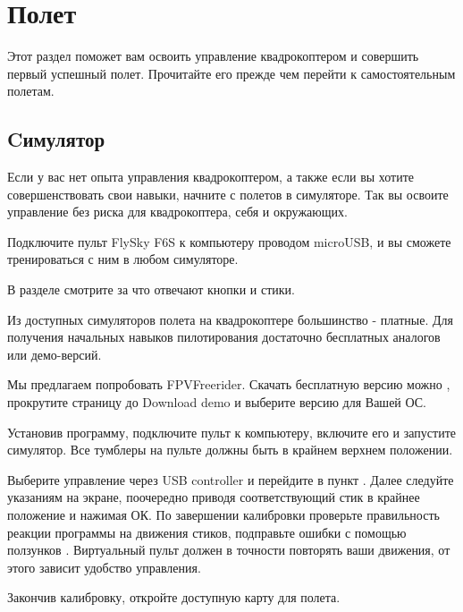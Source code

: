 \documentclass[a4paper,10pt,russian]{sphinxmanual}
\begin{document}
\chapter{Полет}
\label{\detokenize{flight/flight:id1}}\label{\detokenize{flight/flight::doc}}
Этот раздел поможет вам освоить управление квадрокоптером и совершить первый успешный полет. Прочитайте его прежде чем перейти к самостоятельным полетам.


\section{Cимулятор}
\label{\detokenize{flight/simulator:c}}\label{\detokenize{flight/simulator::doc}}
Если у вас нет опыта управления квадрокоптером, а также если вы хотите совершенствовать свои навыки, начните с полетов в симуляторе. Так вы освоите управление без риска для квадрокоптера, себя и окружающих.

Подключите пульт FlySky F6S к компьютеру проводом microUSB, и вы сможете тренироваться с ним в любом симуляторе.

В разделе {\hyperref[\detokenize{flight/rc_unit::doc}]{}} смотрите за что отвечают кнопки и стики.

Из доступных симуляторов полета на квадрокоптере большинство - платные. Для получения начальных навыков пилотирования достаточно бесплатных аналогов или демо-версий.

Мы предлагаем попробовать FPVFreerider. Скачать бесплатную версию можно  , прокрутите страницу до Download demo и выберите версию для Вашей ОС.

Установив программу, подключите пульт к компьютеру, включите его и запустите симулятор. Все тумблеры на пульте должны быть в крайнем верхнем положении.

\noindent{}

Выберите управление через USB controller и перейдите в пункт . Далее следуйте указаниям на экране, поочередно приводя соответствующий стик в крайнее положение и нажимая ОК. По завершении калибровки проверьте правильность реакции программы на движения стиков, подправьте ошибки с помощью ползунков . Виртуальный пульт должен в точности повторять ваши движения, от этого зависит удобство управления.

Закончив калибровку, откройте доступную карту для полета.
\end{document}
